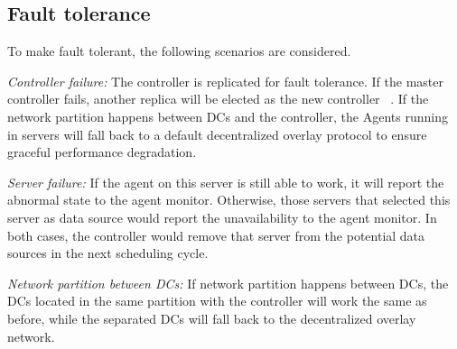 

\subsection{Fault tolerance}
\label{subsec:system:fault}
To make \name fault tolerant, the following scenarios are considered.%

\begin{packedenumerate}
\item \emph{Controller failure:} The controller is replicated for fault tolerance. If the master controller fails, another replica will be elected as the new controller ~\cite{lamport1998part}. If the network partition happens between DCs and the controller, the Agents running in servers will fall back to a default decentralized overlay protocol to ensure graceful performance degradation.
\item \emph{Server failure:} If the agent on this server is still able to work, it will report the abnormal state to the agent monitor. Otherwise, those servers that selected this server as data source would report the unavailability to the agent monitor. In both cases, the controller would remove that server from the potential data sources in the next scheduling cycle.
\item \emph{Network partition between DCs:}
If network partition happens between DCs, the DCs located in the same partition with the controller will work the same as before, while the separated DCs will fall back to the decentralized overlay network.
\end{packedenumerate}
%
%
%
%
%



